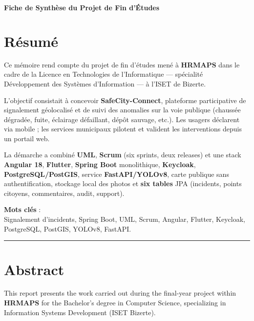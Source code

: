 
\thispagestyle{empty}
\newpage

\begin{center}
    \large\bfseries Fiche de Synthèse du Projet de Fin d'Études
\end{center}

\vspace{0.6cm}

\section*{Résumé}
Ce mémoire rend compte du projet de fin d’études mené à \textbf{HRMAPS} dans le cadre de la Licence en Technologies de l’Informatique — spécialité Développement des Systèmes d’Information — à l’ISET de Bizerte.

L’objectif consistait à concevoir \textbf{SafeCity-Connect}, plateforme participative de signalement géolocalisé et de suivi des anomalies sur la voie publique (chaussée dégradée, fuite, éclairage défaillant, dépôt sauvage, etc.). Les usagers déclarent via mobile ; les services municipaux pilotent et valident les interventions depuis un portail web.

La démarche a combiné \textbf{UML}, \textbf{Scrum} (six sprints, deux releases) et une stack \textbf{Angular 18}, \textbf{Flutter}, \textbf{Spring Boot} monolithique, \textbf{Keycloak}, \textbf{PostgreSQL/PostGIS}, service \textbf{FastAPI/YOLOv8}, carte publique sans authentification, stockage local des photos et \textbf{six tables} JPA (incidents, points citoyens, commentaires, audit, support).

\vspace{0.2cm}
\noindent \textbf{Mots clés} : \\
Signalement d'incidents, Spring Boot, UML, Scrum, Angular, Flutter, Keycloak, PostgreSQL, PostGIS, YOLOv8, FastAPI.

\vspace{1.0cm}
\hrule
\vspace{1.0cm}

\section*{Abstract}
This report presents the work carried out during the final-year project within \textbf{HRMAPS} for the Bachelor's degree in Computer Science, specializing in Information Systems Development (ISET Bizerte).

